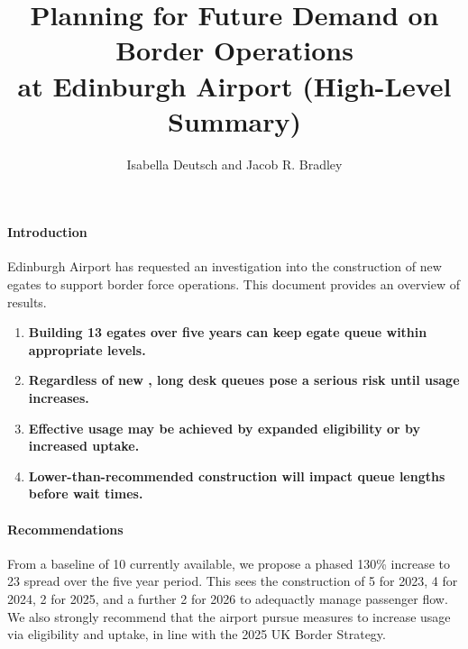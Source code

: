 \documentclass[10pt]{article}
\title{Planning for Future Demand on Border Operations\\ at Edinburgh Airport (High-Level Summary)}
\author{Isabella Deutsch and Jacob R. Bradley}
\date{}
\begin{document}
\maketitle
\thispagestyle{empty}

\vspace{-15pt}
\paragraph{Introduction}
Edinburgh Airport has requested an investigation into the construction of new \glspl{egate} to support border force operations. This document provides an overview of results.
\begin{tcolorbox}[
colframe=edi-dark-purple,
colback=edi-light-purple,
fonttitle=\bfseries,
title = {Report Highlights}]
\begin{enumerate}[itemsep=-1ex]
   \vspace{-1.5mm}
    \item[\ding{40}] \textbf{Building 13 \glspl{egate} over five years can keep \gls{egate} queue  within appropriate levels.}\\
    \vspace{-1.5mm}
    \item[\ding{40}] \textbf{Regardless of new , long desk queues pose a serious risk until  usage increases.}\\
    \vspace{-1.5mm}
    \item[\ding{40}] \textbf{Effective  usage may be achieved by expanded eligibility or by increased uptake.}\\
    \vspace{-1.5mm}
    \item[\ding{40}] \textbf{Lower-than-recommended  construction will impact queue lengths before wait times.}
    \vspace{-1.5mm}
\end{enumerate}
\end{tcolorbox}
\paragraph{Recommendations}
From a baseline of 10  currently available, we propose a phased 130\% increase to 23  spread over the five year period. This sees the construction of 5  for 2023, 4 for 2024, 2 for 2025, and a further 2 for 2026 to adequactly manage passenger flow.  We also strongly recommend that the airport pursue measures to increase  usage via eligibility and uptake, in line with the 2025 UK Border Strategy. 
\end{document}
